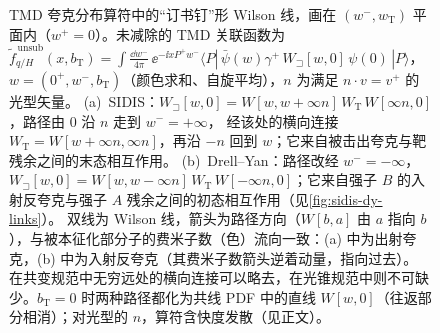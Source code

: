 \begin{figure}[htbp]
\caption{TMD 夸克分布算符中的“订书钉”形 Wilson 线，画在 $(w^-,w_{\mathrm T})$ 平面内（$w^+=0$）。未减除的 TMD 关联函数为
$\tilde f^{\,\mathrm{unsub}}_{q/H}(x,b_{\mathrm T})=\int\frac{\dd w^-}{4\pi}\,\ee^{-\ii xP^+w^-}\langle P|\,\bar\psi(w)\gamma^+\,W_{\sqsupset}[w,0]\,\psi(0)\,|P\rangle$，
$w=(0^+,w^-,b_{\mathrm T})$（颜色求和、自旋平均），$n$ 为满足 $n\cdot v=v^+$ 的光型矢量。
(a)~SIDIS：$W_{\sqsupset}[w,0]=W[w,w+\infty n]\,W_{\mathrm T}\,W[\infty n,0]$，路径由 $0$ 沿 $n$ 走到 $w^-=+\infty$，
经该处的横向连接 $W_{\mathrm T}=W[w+\infty n,\infty n]$，再沿 $-n$ 回到 $w$；它来自被击出夸克与靶残余之间的末态相互作用。
(b)~Drell--Yan：路径改经 $w^-=-\infty$，$W_{\sqsupset}[w,0]=W[w,w-\infty n]\,W_{\mathrm T}\,W[-\infty n,0]$；它来自强子 $B$ 的入射反夸克与强子 $A$ 残余之间的初态相互作用（见\cref{fig:sidis-dy-links}）。
双线为 Wilson 线，箭头为路径方向（$W[b,a]$ 由 $a$ 指向 $b$），与被本征化部分子的费米子数（色）流向一致：(a) 中为出射夸克，(b) 中为入射反夸克（其费米子数箭头逆着动量，指向过去）。
在共变规范中无穷远处的横向连接可以略去，在光锥规范中则不可缺少。$b_{\mathrm T}=0$ 时两种路径都化为共线 PDF 中的直线 $W[w,0]$（往返部分相消）；对光型的 $n$，算符含快度发散（见正文）。}
\label{fig:tmd-staple}
\end{figure}

